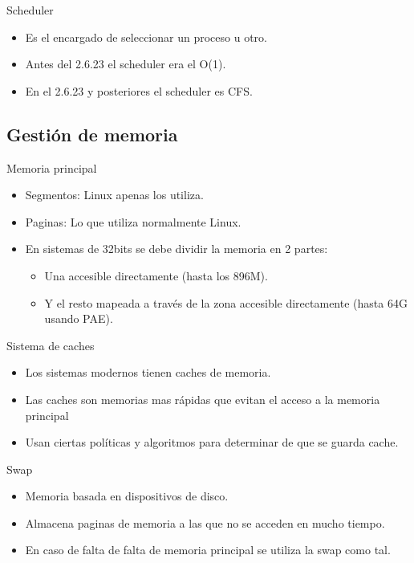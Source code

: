 \begin{frame}{Scheduler}
	\begin{itemize}
		\item Es el encargado de seleccionar un proceso u otro.
		\item Antes del 2.6.23 el scheduler era el O(1).
		\item En el 2.6.23 y posteriores el scheduler es CFS.
	\end{itemize}
\end{frame}

\subsection{Gestión de memoria}
\begin{frame}{Memoria principal}
	\begin{itemize}
		\item Segmentos: Linux apenas los utiliza.
		\item Paginas: Lo que utiliza normalmente Linux.
		\item En sistemas de 32bits se debe dividir la memoria en 2 partes:
		\begin{itemize}
			\item Una accesible directamente (hasta los 896M).
			\item Y el resto mapeada a través de la zona accesible directamente (hasta 64G usando PAE).
		\end{itemize}
	\end{itemize}
\end{frame}

\begin{frame}{Sistema de caches}
	\begin{itemize}
		\item Los sistemas modernos tienen caches de memoria.
		\item Las caches son memorias mas rápidas que evitan el acceso a la memoria principal
		\item Usan ciertas políticas y algoritmos para determinar de que se guarda cache.
	\end{itemize}
\end{frame}

\begin{frame}{Swap}
	\begin{itemize}
		\item Memoria basada en dispositivos de disco.
		\item Almacena paginas de memoria a las que no se acceden en mucho tiempo.
		\item En caso de falta de falta de memoria principal se utiliza la swap como tal.
	\end{itemize}
\end{frame}

